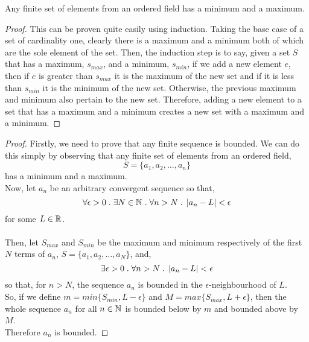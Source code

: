 \documentclass[MathsNotesBase.tex]{subfiles}
\begin{document}
{		\bigskip
		\begin{lemma}
			Any finite set of elements from an ordered field has a minimum and a maximum.
		\end{lemma}
		\begin{proof}
			This can be proven quite easily using induction. Taking the base case of a set of cardinality one, clearly there is a maximum and a minimum both of which are the sole element of the set. Then, the induction step is to say, given a set $S$ that has a maximum, $s_{max}$, and a minimum, $s_{min}$, if we add a new element $e$, then if $e$ is greater than $s_{max}$ it is the maximum of the new set and if it is less than $s_{min}$ it is the minimum of the new set. Otherwise, the previous maximum and minimum also pertain to the new set. Therefore, adding a new element to a set that has a maximum and a minimum creates a new set with a maximum and a minimum.
		\end{proof}
		\bigskip
		\begin{proof}
			Firstly, we need to prove that any finite sequence is bounded. We can do this simply by observing that any finite set of elements from an ordered field,
			\[ S = \{a_1, a_2, \dots , a_n\} \]
			has a minimum and a maximum.\\
			Now, let $a_n$ be an arbitrary convergent sequence so that,
			\[ \forall \epsilon > 0 \;.\; \exists N \in \mathbb{N}^{} \;.\; \forall n > N \;.\; \left\lvert a_n - L\right\rvert < \epsilon \]
			for some $L \in \mathbb{R}^{}$.\\\\
			Then, let $S_{max}$ and $S_{min}$ be the maximum and minimum respectively of the first $N$ terms of $a_n$, $S = \{a_1, a_2, \dots , a_N\}$, and,
			\[ \exists \epsilon > 0 \;.\; \forall n > N \;.\; \left\lvert a_n - L\right\rvert < \epsilon \]
			so that, for $n > N$, the sequence $a_n$ is bounded in the $\epsilon$-neighbourhood of $L$.\\
			So, if we define ${ m = min\{S_{min}, L - \epsilon\} }$ and ${ M = max\{S_{max}, L + \epsilon\} }$, then the whole sequence $a_n$ for all $n \in \mathbb{N}^{}$ is bounded below by $m$ and bounded above by $M$.\\
			Therefore $a_n$ is bounded. 
		\end{proof}
	
		\bigskip
		
}
\end{document}
